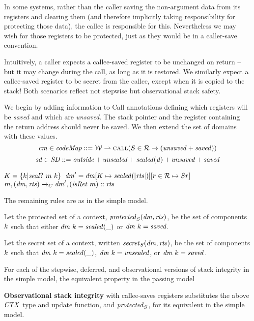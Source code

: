 \documentclass[acmsmall,review,anonymous]{acmart}\settopmatter{printfolios=true,printccs=false,printacmref=false}
\begin{document}
{In some systems, rather than the caller saving the non-argument data from its registers
and clearing them (and therefore implicitly taking responsibility for protecting those data),
the callee is responsible for this. Nevertheless we may wish for those registers to be
protected, just as they would be in a caller-save convention.

Intuitively, a caller expects a callee-saved register to be unchanged on return -- but it
may change during the call, as long as it is restored. We similarly expect a callee-saved
register to be secret from the callee, except when it is copied to the stack! Both scenarios
reflect not stepwise but observational stack safety.

We begin by adding information to Call annotations defining which registers will be {\em saved}
and which are {\em unsaved}. The stack pointer and the register containing the return address
should never be saved. We then extend the set of domains with these values.
%
\[\mathit{cm} \in \mathit{codeMap} ::= {\mathcal W} \rightharpoonup \text{\sc call}(S \in {\mathcal R} \rightarrow (\mathit{unsaved} + \mathit{saved}))\]
%
\[\mathit{sd} \in \mathit{SD} ::= \mathit{outside} + \mathit{unsealed} + \mathit{sealed(d)} + \mathit{unsaved} + \mathit{saved}\]

              {\(K = \{k | \mathit{seal?} ~ m ~ k\}\)}
              {\(\mathit{dm}' = \mathit{dm}[K \mapsto \mathit{sealed(|\mathit{rts}|)}][r \in {\mathcal R} \mapsto S r]\)}
              {\(m,(\mathit{dm},\mathit{rts}) \xrightarrow{}_C \mathit{dm}',(\mathit{isRet} ~ m)::\mathit{rts}\)}

The remaining rules are as in the simple model.

 Let the protected set of a context, \(\mathit{protected}_S(\mathit{dm},\mathit{rts})\),
be the set of components \(k\) such that either \(\mathit{dm} ~ k = \mathit{sealed(\mbox{\_})}\)
or \(\mathit{dm} ~ k = \mathit{saved}\).

 Let the secret set of a context, written \(\mathit{secret}_S(\mathit{dm},\mathit{rts})\),
be the set of components \(k\) such that
\(\mathit{dm} ~ k = \mathit{sealed(\mbox{\_})}\), \(\mathit{dm} ~ k = \mathit{unsealed}\), or
\(\mathit{dm} ~ k = \mathit{saved}\).

For each of the stepwise, deferred, and observational versions of
stack integrity in the simple model, the equivalent property in the
passing model

{\bf Observational stack integrity} with callee-saves registers substitutes the above
\(\mathit{CTX}\) type and update function, and \(\mathit{protected}_S\), for its equivalent in the simple model.

}
\end{document}

